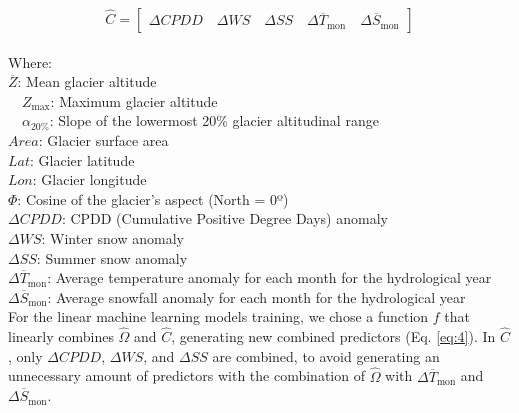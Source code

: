 \begin{equation} \label{eq:3}
\widehat{C}=\left[\begin{array}{lllll}{\Delta C P D D} \quad {\Delta W S} \quad {\Delta S S} \quad {\Delta \overline{T}_{\operatorname{mon}}} \quad {\Delta \overline{S}_{\operatorname{mon}}}\end{array}\right]
\end{equation}
\\ 
Where: \\
$\overline{Z}$: Mean glacier altitude \\
$\quad Z_{\max }$: Maximum glacier altitude \\
$\quad \alpha_{20\%}$: Slope of the lowermost 20\% glacier altitudinal range \\
$Area$: Glacier surface area \\
$Lat$: Glacier latitude \\
$Lon$: Glacier longitude \\
$\Phi$: Cosine of the glacier’s aspect (North = 0º) \\
${\Delta C P D D}$: CPDD (Cumulative Positive Degree Days) anomaly \\
${\Delta W S}$: Winter snow anomaly \\
${\Delta S S}$: Summer snow anomaly \\
${\Delta \overline{T}_{\operatorname{mon}}}$: Average temperature anomaly for each month for the hydrological year \\
${\Delta \overline{S}_{\operatorname{mon}}}$: Average snowfall anomaly for each month for the hydrological year \\

For the linear machine learning models training, we chose a function $f$ that linearly combines $\hat{\Omega}$ and $\hat{C}$, generating new combined predictors (Eq. \ref{eq:4}). In $\hat{C}$, only ${\Delta CPDD}$, ${\Delta WS}$, and ${\Delta SS}$ are combined, to avoid generating an unnecessary amount of predictors with the combination of $\hat{\Omega}$ with ${\Delta \overline{T}_{\operatorname{mon}}}$ and ${\Delta \overline{S}_{\operatorname{mon}}}$.

